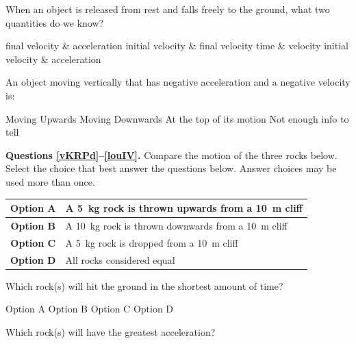 \documentclass[]{exam}
\begin{document}
\begin{questions}
\question
When an object is released from rest and falls freely to the ground, what two quantities do we know?

\begin{randomizechoices}[norandomize]
    \choice final velocity \& acceleration
    \choice initial velocity \& final velocity
    \choice time \& velocity
    \correctchoice initial velocity \& acceleration
\end{randomizechoices}

\question 
An object moving vertically that has negative acceleration and a negative velocity is:

\begin{randomizechoices}[norandomize]
    \choice Moving Upwards
    \correctchoice Moving Downwards
    \choice At the top of its motion
    \choice Not enough info to tell
\end{randomizechoices}

\begin{EnvUplevel}
    \textbf{Questions \ref{vKRPd}--\ref{louIV}.} Compare the motion of the three rocks below. Select the choice that best answer the questions below. Answer choices may be used more than once.
\end{EnvUplevel}

\begin{center}
    \begin{tabular}{|c|l|}
        \hline 
        \textbf{Option A} & A \SI{5}{kg} rock is thrown upwards from a \SI{10}{m} cliff\\ \hline
        \textbf{Option B} & A \SI{10}{kg}  rock is thrown downwards from a \SI{10}{m} cliff\\ \hline
        \textbf{Option C} & A \SI{5}{kg} rock is dropped from a \SI{10}{m} cliff\\ \hline
        \textbf{Option D} &  All rocks considered equal\\ \hline
    \end{tabular}
\end{center}

\question \label{vKRPd}
Which rock(s) will hit the ground in the shortest amount of time?

\begin{randomizechoices}[norandomize]
    \choice Option A
    \correctchoice Option B
    \choice Option C
    \choice Option D
\end{randomizechoices}

\question
Which rock(s) will have the greatest acceleration?


\end{questions}
\end{document}
